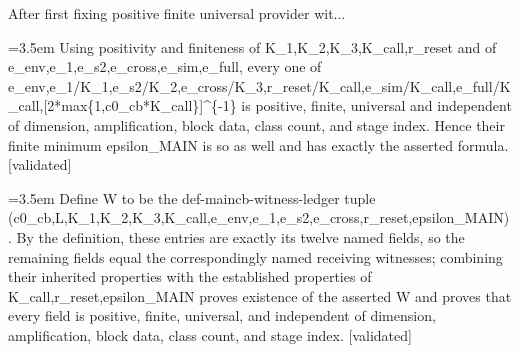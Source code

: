 \documentclass{article}
\newcommand{\step}[1]{\par\noindent\hangindent=3.5em\hangafter=1%
  \makebox[3.5em][l]{\textbf{#1.}}}
\newcommand{\steptag}[1]{\hfill{\small\textsf{[#1]}}}
\begin{document}
\begin{proofbox}{After first fixing positive finite universal provider wit...}
\step{1.4} Using positivity and finiteness of K\_1,K\_2,K\_3,K\_call,r\_reset and of e\_env,e\_1,e\_s2,e\_cross,e\_sim,e\_full, every one of e\_env,e\_1/K\_1,e\_s2/K\_2,e\_cross/K\_3,r\_reset/K\_call,e\_sim/K\_call,e\_full/K\_call,[2*max\{1,c0\_cb*K\_call\}]\textasciicircum{}\{-1\} is positive, finite, universal and independent of dimension, amplification, block data, class count, and stage index. Hence their finite minimum epsilon\_MAIN is so as well and has exactly the asserted formula. \steptag{validated} \\[4pt]
\step{1.5} Define W to be the def-maincb-witness-ledger tuple (c0\_cb,L,K\_1,K\_2,K\_3,K\_call,e\_env,e\_1,e\_s2,e\_cross,r\_reset,epsilon\_MAIN). By the definition, these entries are exactly its twelve named fields, so the remaining fields equal the correspondingly named receiving witnesses; combining their inherited properties with the established properties of K\_call,r\_reset,epsilon\_MAIN proves existence of the asserted W and proves that every field is positive, finite, universal, and independent of dimension, amplification, block data, class count, and stage index. \steptag{validated} \\[4pt]
\end{proofbox}
\end{document}
